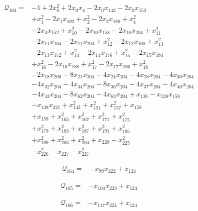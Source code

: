 \begin{align*}
\mathcal{Q}_{163}={}&-1+2x_{0}^{2}+2x_{0}x_{4}-2x_{0}x_{143}-2x_{0}x_{152}\\
&+x_{1}^{2}-2x_{1}x_{192}+x_{2}^{2}-2x_{2}x_{180}+x_{4}^{2}\\
&-2x_{4}x_{152}+x_{10}^{2}-2x_{10}x_{158}-2x_{10}x_{204}+x_{11}^{2}\\
&-2x_{11}x_{164}-2x_{11}x_{204}+x_{12}^{2}-2x_{12}x_{168}+x_{13}^{2}\\
&-2x_{13}x_{172}+x_{14}^{2}-2x_{14}x_{176}+x_{15}^{2}-2x_{15}x_{184}\\
&+x_{16}^{2}-2x_{16}x_{188}+x_{17}^{2}-2x_{17}x_{196}+x_{18}^{2}\\
&-2x_{18}x_{200}-8x_{21}x_{204}-4x_{24}x_{204}-4x_{28}x_{204}-4x_{30}x_{204}\\
&-4x_{32}x_{204}-4x_{34}x_{204}-8x_{36}x_{204}-4x_{37}x_{204}-4x_{40}x_{204}\\
&-4x_{43}x_{204}-8x_{62}x_{204}-4x_{63}x_{204}+x_{138}-x_{138}x_{158}\\
&-x_{138}x_{221}+x_{142}^{2}+x_{151}^{2}+x_{157}^{2}+x_{158}\\
&+x_{159}+x_{163}^{2}+x_{167}^{2}+x_{171}^{2}+x_{175}^{2}\\
&+x_{179}^{2}+x_{183}^{2}+x_{187}^{2}+x_{191}^{2}+x_{195}^{2}\\
&+x_{199}^{2}+x_{203}^{2}+x_{204}^{2}+x_{220}-x_{225}^{2}\\
&-x_{226}^{2}-x_{227}-x_{227}^{2}
\end{align*}

\begin{align*}
\mathcal{Q}_{164}={}&-x_{99}x_{222}+x_{124}
\end{align*}

\begin{align*}
\mathcal{Q}_{165}={}&-x_{104}x_{223}+x_{124}
\end{align*}

\begin{align*}
\mathcal{Q}_{166}={}&-x_{117}x_{224}+x_{124}
\end{align*}

